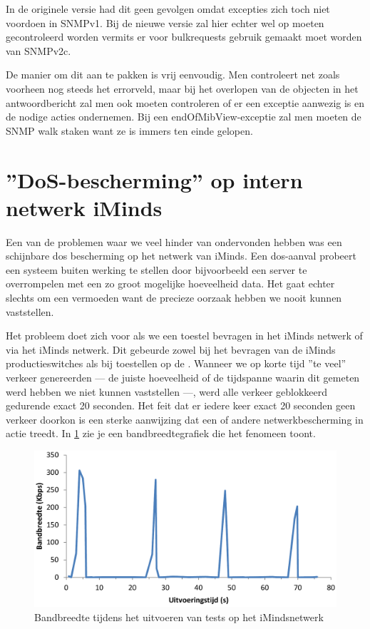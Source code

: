 In de originele versie had dit geen gevolgen omdat excepties zich toch niet voordoen in SNMPv1.
Bij de nieuwe versie zal hier echter wel op moeten gecontroleerd worden vermits er voor bulkrequests gebruik gemaakt moet worden van SNMPv2c.

De manier om dit aan te pakken is vrij eenvoudig.
Men controleert net zoals voorheen nog steeds het errorveld, maar bij het overlopen van de objecten in het antwoordbericht
zal men ook moeten controleren of er een exceptie aanwezig is en de nodige acties ondernemen.
Bij een endOfMibView-exceptie zal men moeten de SNMP walk staken want ze is immers ten einde gelopen.


\section{''DoS-bescherming'' op intern netwerk iMinds}
\label{probleem-dos-bescherming}


Een van de problemen waar we veel hinder van ondervonden hebben was een schijnbare \gls{dos} bescherming op het netwerk van iMinds.
Een \gls{dos}-aanval probeert een systeem buiten werking te stellen door bijvoorbeeld een server te overrompelen met een zo groot mogelijke hoeveelheid data.
Het gaat echter slechts om een vermoeden want de precieze oorzaak hebben we nooit kunnen vaststellen.

Het probleem doet zich voor als we een toestel bevragen in het iMinds netwerk of via het iMinds netwerk.
Dit gebeurde zowel bij het bevragen van de iMinds productieswitches als bij toestellen op de \vwall{}.
Wanneer we op korte tijd ''te veel'' verkeer genereerden --- de juiste hoeveelheid of de tijdspanne waarin dit gemeten werd hebben we niet kunnen vaststellen ---, werd alle verkeer geblokkeerd gedurende exact 20 seconden.
Het feit dat er iedere keer exact 20 seconden geen verkeer doorkon is een sterke aanwijzing dat een of andere netwerkbescherming in actie treedt.
In \cref{fig-dos-bescherming} zie je een bandbreedtegrafiek die het fenomeen toont.

\begin{figure}[h]
	\centering
	\includegraphics[scale=0.40]{figures/dos-bescherming}
	\caption{Bandbreedte tijdens het uitvoeren van tests op het iMindsnetwerk}
	\label{fig-dos-bescherming}
\end{figure}

